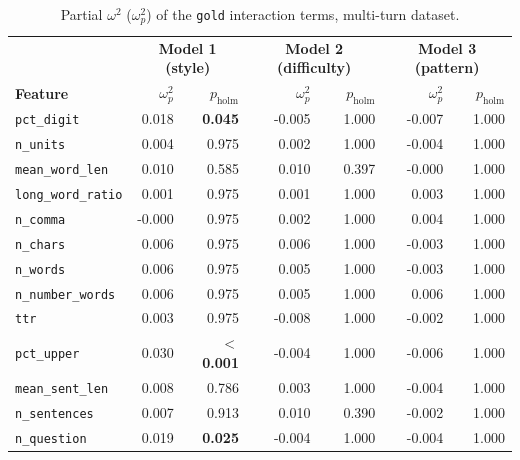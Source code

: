 \begin{table}[H]
    \vspace{3em}

    \begin{tabular}{@{}lrrrrrr@{}}
        \toprule
        & \multicolumn{2}{c}{\textbf{Model 1 (style)}} & \multicolumn{2}{c}{\textbf{Model 2 (difficulty)}} & \multicolumn{2}{c}{\textbf{Model 3 (pattern)}} \\
        \textbf{Feature} & $\omega_p^2$ & $p_{\text{holm}}$ & $\omega_p^2$ & $p_{\text{holm}}$ & $\omega_p^2$ & $p_{\text{holm}}$ \\
        \midrule
        \texttt{pct\_digit}        & \cellcolor{omegaSmall}0.018  & \textbf{0.045} & -0.005 & 1.000 & -0.007 & 1.000 \\
        \texttt{n\_units}          & 0.004  & 0.975 & 0.002  & 1.000 & -0.004 & 1.000 \\
        \texttt{mean\_word\_len}   & 0.010  & 0.585 & 0.010  & 0.397 & -0.000 & 1.000 \\
        \texttt{long\_word\_ratio} & 0.001  & 0.975 & 0.001  & 1.000 & 0.003  & 1.000 \\
        \texttt{n\_comma}          & -0.000 & 0.975 & 0.002  & 1.000 & 0.004  & 1.000 \\
        \texttt{n\_chars}          & 0.006  & 0.975 & 0.006  & 1.000 & -0.003 & 1.000 \\
        \texttt{n\_words}          & 0.006  & 0.975 & 0.005  & 1.000 & -0.003 & 1.000 \\
        \texttt{n\_number\_words}  & 0.006  & 0.975 & 0.005  & 1.000 & 0.006  & 1.000 \\
        \texttt{ttr}               & 0.003  & 0.975 & -0.008 & 1.000 & -0.002 & 1.000 \\
        \texttt{pct\_upper}        & \cellcolor{omegaSmall}0.030  & \textbf{$<$0.001} & -0.004 & 1.000 & -0.006 & 1.000 \\
        \texttt{mean\_sent\_len}   & 0.008  & 0.786 & 0.003  & 1.000 & -0.004 & 1.000 \\
        \texttt{n\_sentences}      & 0.007  & 0.913 & 0.010  & 0.390 & -0.002 & 1.000 \\
        \texttt{n\_question}       & \cellcolor{omegaSmall}0.019  & \textbf{0.025} & -0.004 & 1.000 & -0.004 & 1.000 \\
        \bottomrule
    \end{tabular}
    \caption[Partial $\omega^2$ of \texttt{gold} interaction terms, multi-turn dataset]{Partial $\omega^2$ ($\omega_p^2$) of the \texttt{gold} interaction terms, multi-turn dataset.}
    \label{tab:interactions-multi}
\end{table}

